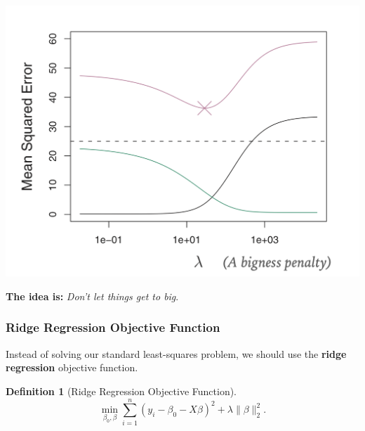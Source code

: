 \documentclass[11pt]{article}
\theoremstyle{definition}
\newtheorem{definition}{Definition}[section]
\numberwithin{equation}{section}
\begin{document}
\includegraphics[scale=0.4]{./images/overfitting.png}

\textbf{The idea is:} \textit{Don't let things get to big}.

\subsubsection{Ridge Regression Objective Function}

Instead of solving our standard least-squares problem, we should use the \textbf{ridge regression} objective function.

\begin{definition}[Ridge Regression Objective Function]
\begin{equation}\label{ridge-objective}
  \min_{\beta_0, \beta}\sum^n_{i=1}(y_i-\beta_0-X\beta)^2 + \lambda\|\beta\|^2_2.
\end{equation}
\end{definition}
\end{document}
